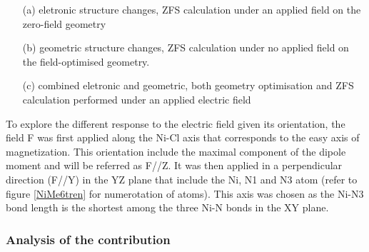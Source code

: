 \documentclass[10pt]{report}
\numberwithin{equation}{section}
\begin{document}
\begin{itemize}
    \item[(a)] eletronic structure changes, ZFS calculation under an applied field on the zero-field geometry
    \item[(b)] geometric structure changes, ZFS calculation under no applied field on the field-optimised geometry.
    \item[(c)] combined eletronic and geometric, both geometry optimisation and ZFS calculation performed under an applied electric field
\end{itemize}

To explore the different response to the electric field given its orientation, the field F was first applied along the Ni-Cl axis that corresponds to the easy axis of magnetization.
This orientation include the maximal component of the dipole moment and will be referred as F//Z.
It was then applied in a perpendicular direction (F//Y) in the YZ plane that include the Ni, N1 and N3 atom (refer to figure \ref{NiMe6tren} for numerotation of atoms). 
This axis was chosen as the Ni-N3 bond length is the shortest among the three Ni-N bonds in the XY plane.

\subsubsection*{Analysis of the contribution}
\end{document}
